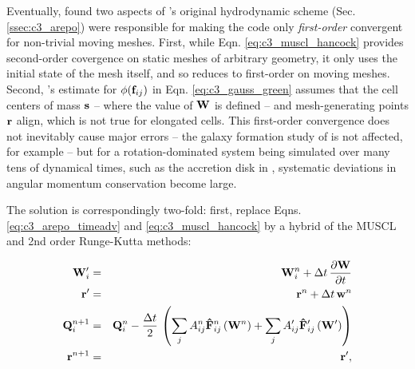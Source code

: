 
Eventually, \cite{pakm+16} found two aspects of \arepo's original hydrodynamic scheme (Sec. \ref{ssec:c3_arepo}) were responsible for making the code only \textit{first-order} convergent for non-trivial moving meshes.  First, while Eqn. \ref{eq:c3_muscl_hancock} provides second-order covergence on static meshes of arbitrary geometry, it only uses the initial state of the mesh itself, and so reduces to first-order on moving meshes.  Second, \arepo's estimate for $\phi({\bf f}_{ij})$ in Eqn. \ref{eq:c3_gauss_green} assumes that the cell centers of mass ${\bf s}$ -- where the value of ${\bf W}$ is defined -- and mesh-generating points ${\bf r}$ align, which is not true for elongated cells.  This first-order convergence does not inevitably cause major errors -- the galaxy formation study of \cite{marips14} is not affected, for example -- but for a rotation-dominated system being simulated over many tens of dynamical times, such as the accretion disk in \cite{pakm+16}, systematic deviations in angular momentum conservation become large.

The solution is correspondingly two-fold: first, replace Eqns. \ref{eq:c3_arepo_timeadv} and \ref{eq:c3_muscl_hancock} by a hybrid of the MUSCL and 2nd order Runge-Kutta methods:

\begin{eqnarray}
{\bf W}^\prime_i &=& {\bf W}^n_i + \Delta t \, \frac{\partial {\bf W}}{\partial t} \nonumber \\
{\bf r}^\prime &=& {\bf r}^n +  \Delta t \, {\bf w}^n \nonumber \\
{\bf Q}^{n+1}_i &=& {\bf Q}^n_i - \frac{\Delta t}{2} \, \left( \sum_j A^n_{ij} {\bf \hat{F}}_{ij}^{n} \left( {\bf W}^n \right) + \sum_j A^\prime_{ij} {\bf \hat{F}}_{ij}^{\prime} \left( {\bf W}^\prime \right) \right) \nonumber \\
{\bf r}^{n+1} &=& {\bf r}^\prime,
\end{eqnarray}

